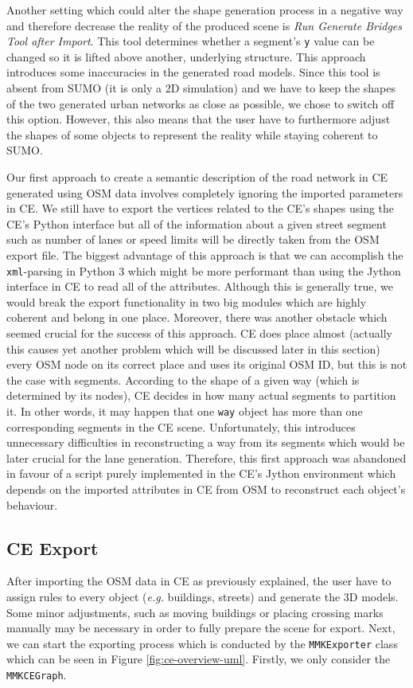 Another setting which could alter the shape generation process in a negative way and therefore decrease the reality of the produced scene is \emph{Run Generate Bridges Tool after Import}. This tool determines whether a segment's \texttt{y} value can be changed so it is lifted above another, underlying structure. This approach introduces some inaccuracies in the generated road models. Since this tool is absent from SUMO (it is only a 2D simulation) and we have to keep the shapes of the two generated urban networks as close as possible, we chose to switch off this option. However, this also means that the user have to furthermore adjust the shapes of some objects to represent the reality while staying coherent to SUMO.

Our first approach to create a semantic description of the road network in CE generated using OSM data involves completely ignoring the imported parameters in CE. We still have to export the vertices related to the CE's shapes using the CE's Python interface but all of the information about a given street segment such as number of lanes or speed limits will be directly taken from the OSM export file. The biggest advantage of this approach is that we can accomplish the \texttt{xml}-parsing in Python 3 which might be more performant than using the Jython interface in CE to read all of the attributes. Although this is generally true, we would break the export functionality in two big modules which are highly coherent and belong in one place. Moreover, there was another obstacle which seemed crucial for the success of this approach. CE does place almost (actually this causes yet another problem which will be discussed later in this section) every OSM node on its correct place and uses its original OSM ID, but this is not the case with segments. According to the shape of a given way (which is determined by its nodes), CE decides in how many actual segments to partition it. In other words, it may happen that one \texttt{way} object has more than one corresponding segments in the CE scene. Unfortunately, this introduces unnecessary difficulties in reconstructing a way from its segments which would be later crucial for the lane generation. Therefore, this first approach was abandoned in favour of a script purely implemented in the CE's Jython environment which depends on the imported attributes in CE from OSM to reconstruct each object's behaviour. 

\subsection{CE Export}
After importing the OSM data in CE as previously explained, the user have to assign rules to every object (\emph{e.g.} buildings, streets) and generate the 3D models. Some minor adjustments, such as moving buildings or placing crossing marks manually may be necessary in order to fully prepare the scene for export. Next, we can start the exporting process which is conducted by the \texttt{MMKExporter} class which can be seen in Figure \ref{fig:ce-overview-uml}. Firstly, we only consider the \texttt{MMKCEGraph}. 

